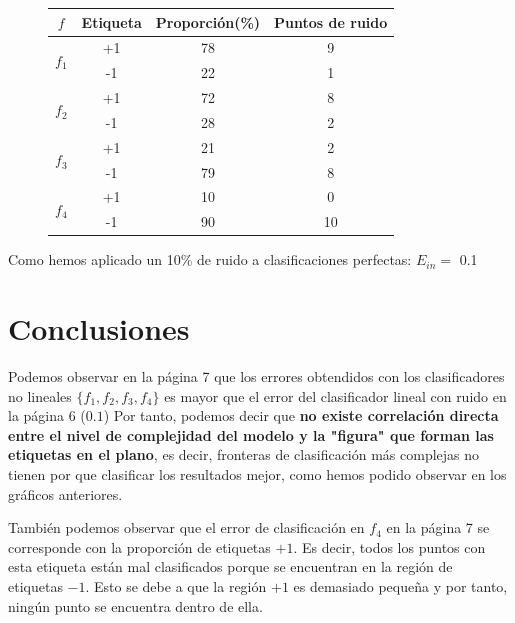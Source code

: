 \documentclass{article}
\begin{document}
    \begin{figure}[h]
    \centering
    \begin{tabular}{ |c|c|c|c| }
        \hline
        $f$                    & Etiqueta & Proporción(\%) & Puntos de ruido \\
        \hline
        \multirow{2}{*}{$f_1$} & +1       & 78             & 9               \\
                               & -1       & 22             & 1               \\
        \hline
        \multirow{2}{*}{$f_2$} & +1       & 72             & 8               \\
                               & -1       & 28             & 2               \\
        \hline
        \multirow{2}{*}{$f_3$} & +1       & 21             & 2               \\
                               & -1       & 79             & 8               \\
        \hline
        \multirow{2}{*}{$f_4$} & +1       & 10             & 0               \\
                               & -1       & 90             & 10              \\
        \hline
    \end{tabular}
    \end{figure}

    Como hemos aplicado un 10\% de ruido a clasificaciones perfectas: $E_{in} = $ 0.1

    \pagebreak

    \section*{Conclusiones}

    Podemos observar en la página 7 que los errores obtendidos con los clasificadores
    no lineales $\{f_1, f_2, f_3, f_4\}$ es mayor que el error del clasificador lineal
    con ruido en la página 6 ($0.1$)
    Por tanto, podemos decir que
    \textbf{no existe correlación directa entre el nivel de complejidad del modelo y la "figura"
    que forman las etiquetas en el plano}, es decir,
    fronteras de clasificación más complejas no tienen
    por que clasificar los resultados mejor, como hemos podido observar en los gráficos anteriores.
    
    También podemos observar que el error de clasificación en $f_4$ en la página 7 se corresponde con
    la proporción de etiquetas $+1$. Es decir, todos los puntos con esta etiqueta
    están mal clasificados porque se encuentran en la región de etiquetas $-1$. Esto se debe
    a que la región $+1$ es demasiado pequeña y por tanto, ningún punto se encuentra dentro de ella.
\end{document}
